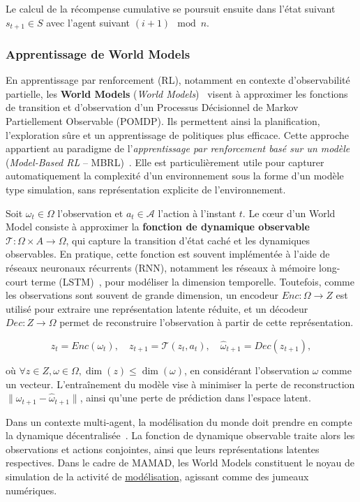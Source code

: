 Le calcul de la récompense cumulative se poursuit ensuite dans l'état suivant $s_{t+1} \in S$ avec l'agent suivant $(i+1) \mod n$.

\subsubsection{Apprentissage de World Models}

En apprentissage par renforcement (RL), notamment en contexte d'observabilité partielle, les \textbf{World Models} (\textit{World Models})~\cite{ha2018recurrent} visent à approximer les fonctions de transition et d'observation d'un Processus Décisionnel de Markov Partiellement Observable (POMDP). Ils permettent ainsi la planification, l'exploration sûre et un apprentissage de politiques plus efficace. Cette approche appartient au paradigme de l'\textit{apprentissage par renforcement basé sur un modèle} (\textit{Model-Based RL} – MBRL)~\cite{moerland2020model}. Elle est particulièrement utile pour capturer automatiquement la complexité d'un environnement sous la forme d'un modèle type simulation, sans représentation explicite de l'environnement.

Soit $\omega_t \in \Omega$ l'observation et $a_t \in \mathcal{A}$ l'action à l'instant $t$. Le cœur d'un World Model consiste à approximer la \textbf{fonction de dynamique observable} $\mathcal{T}: \Omega \times A \rightarrow \Omega$, qui capture la transition d'état caché et les dynamiques observables. En pratique, cette fonction est souvent implémentée à l'aide de réseaux neuronaux récurrents (RNN), notamment les réseaux à mémoire long-court terme (LSTM)~\cite{hochreiter1997long}, pour modéliser la dimension temporelle. Toutefois, comme les observations sont souvent de grande dimension, un encodeur $Enc: \Omega \rightarrow Z$ est utilisé pour extraire une représentation latente réduite, et un décodeur $Dec: Z \rightarrow \Omega$ permet de reconstruire l'observation à partir de cette représentation.

\[
    z_t = Enc(\omega_t), \quad
    z_{t+1} = \mathcal{T}(z_t, a_t), \quad
    \hat{\omega}_{t+1} = Dec(z_{t+1}),
\]

où $\forall z \in Z, \omega \in \Omega, \dim(z) \leq \dim(\omega)$, en considérant l'observation $\omega$ comme un vecteur. L'entraînement du modèle vise à minimiser la perte de reconstruction $\|\omega_{t+1} - \hat{\omega}_{t+1}\|$, ainsi qu'une perte de prédiction dans l'espace latent.

Dans un contexte multi-agent, la modélisation du monde doit prendre en compte la dynamique décentralisée~\cite{yang2021representation}. La fonction de dynamique observable traite alors les observations et actions conjointes, ainsi que leurs représentations latentes respectives. Dans le cadre de MAMAD, les World Models constituent le noyau de simulation de la activité de \hyperref[sec:modelling]{modélisation}, agissant comme des jumeaux numériques.



